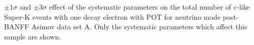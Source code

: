 \begin{table}	
	\begin{adjustbox}{width=\textwidth, totalheight=\textheight, keepaspectratio}
		
	\end{adjustbox}
	\caption
	{
		$\pm1\sigma$ and $\pm3\sigma$ effect of the systematic parameters on the total number of $e$-like Super-K events with one decay electron with \RunPeriod POT for neutrino mode post-BANFF Asimov data set A. Only the systematic parameters which affect this sample are shown.
	}
	\label{tab:sysvar_multire_postfit_Asimov_A}
\end{table}\clearpage